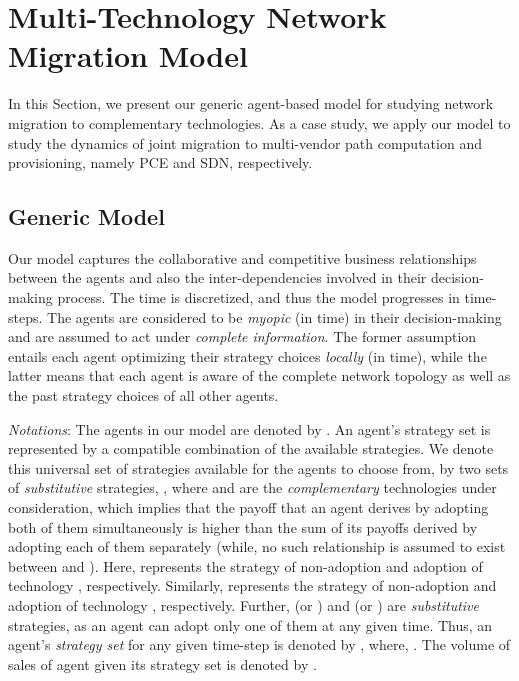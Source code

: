 \documentclass[smallextended]{svjour3}
\begin{document}
\section {Multi-Technology Network Migration Model} \label{sec:model}

\par In this Section, we present our generic agent-based model for studying
network migration to complementary technologies. As a case study, we apply our
model to study the dynamics of joint migration to multi-vendor path computation
and provisioning, namely PCE and SDN, respectively.

\subsection{Generic Model}

\par Our model captures the collaborative and competitive business relationships
between the agents and also the inter-dependencies involved in their
decision-making process. The time is discretized, and thus the model progresses
in time-steps. The agents are considered to be \emph{myopic} (in time) in their
decision-making and are assumed to act under \emph{complete information}. The
former assumption entails each agent optimizing their strategy choices
\emph{locally} (in time), while the latter means that each agent is
aware of the complete network topology as well as the past strategy choices of
all other agents.

\par \emph{Notations}: The agents in our model are denoted by . An agent's strategy set is represented by a compatible combination of
the available strategies. We denote this universal set of strategies available
for the agents to choose from, by two sets of \emph{substitutive} strategies, , where  and  are the \emph{complementary}
technologies under consideration, which implies that the payoff that an agent
derives by adopting both of them simultaneously is higher than the sum of its
payoffs derived by adopting each of them separately (while, no such
relationship is assumed to exist between  and ). Here,
 represents the strategy of non-adoption
and adoption of technology , respectively. Similarly,
 represents the strategy of non-adoption
and adoption of technology , respectively. Further,  (or ) and
 (or ) are \emph{substitutive} strategies, as an agent can
adopt only one of them at any given time. Thus, an agent's \emph{strategy
set} for any given time-step is denoted by , where, . The volume of sales of
agent  given its strategy set  is denoted by .
\end{document}
